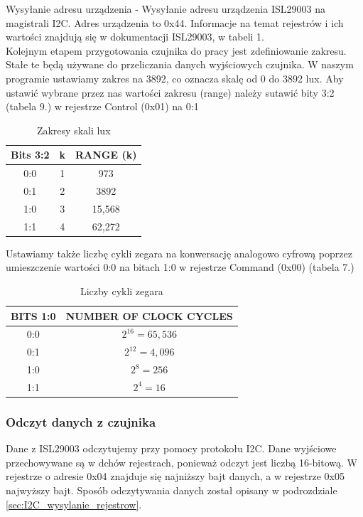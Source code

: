 \documentclass{article}
\begin{document}
    Wysyłanie adresu urządzenia - Wysyłanie adresu urządzenia ISL29003 na magistrali I2C. Adres urządzenia to 0x44.
    Informacje na temat rejestrów i ich wartości znajdują się w dokumentacji ISL29003, w tabeli 1.\\%

    Kolejnym etapem przygotowania czujnika do pracy jest zdefiniowanie zakresu. Stałe te będą używane do przeliczania danych wyjściowych czujnika. W naszym programie ustawiamy zakres na 3892, co oznacza skalę od 0 do 3892 lux. Aby ustawić wybrane przez nas wartości zakresu (range) należy sutawić bity 3:2 (tabela 9.) w rejestrze Control (0x01) na 0:1
    \begin{table}[H]
        \centering
        \begin{tabular}{|c|c|c|}
        \hline
        Bits 3:2 & k & RANGE (k)\\
        \hline
        0:0 & 1 & 973\\
        0:1 & 2 & 3892\\
        1:0 & 3 & 15,568\\
        1:1 & 4 & 62,272\\
        \hline
        \end{tabular}
        \caption{Zakresy skali lux}
    \end{table}
    Ustawiamy także liczbę cykli zegara na konwersację analogowo cyfrową poprzez umieszczenie wartości 0:0 na bitach 1:0 w rejestrze Command (0x00) (tabela 7.)
    \begin{table}[H]
        \centering
        \begin{tabular}{|c|c|}
        \hline
        BITS 1:0 & NUMBER OF CLOCK CYCLES\\
        \hline
        0:0 & $2^{16} = 65,536$\\
        0:1 & $2^{12} = 4,096$\\
        1:0 & $2^{8} = 256$\\
        1:1 & $2^{4} = 16$\\
        \hline
        \end{tabular}
        \caption{Liczby cykli zegara}
    \end{table}

    \subsubsection{Odczyt danych z czujnika}
    Dane z ISL29003 odczytujemy przy pomocy protokołu I2C. Dane wyjściowe przechowywane są w dchów rejestrach, ponieważ odczyt jest liczbą 16-bitową. W rejestrze o adresie 0x04 znajduje się najniższy bajt danych, a w rejestrze 0x05 najwyższy bajt. Sposób odczytywania danych został opisany w podrozdziale \ref{sec:I2C_wysylanie_rejestrow}.
\end{document}

